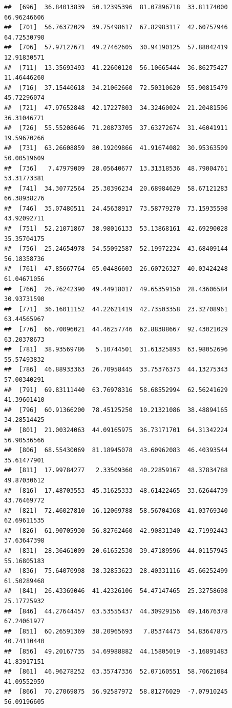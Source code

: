 \documentclass[
]{article}
\begin{document}
\begin{verbatim}
##  [696]  36.84013839  50.12395396  81.07896718  33.81174000  66.96246606
##  [701]  56.76372029  39.75498617  67.82983117  42.60757946  64.72530790
##  [706]  57.97127671  49.27462605  30.94190125  57.88042419  12.91830571
##  [711]  13.35693493  41.22600120  56.10665444  36.86275427  11.46446260
##  [716]  37.15440618  34.21062660  72.50310620  55.90815479  45.72296074
##  [721]  47.97652848  42.17227803  34.32460024  21.20481506  36.31046771
##  [726]  55.55208646  71.20873705  37.63272674  31.46041911  19.59670266
##  [731]  63.26608859  80.19209866  41.91674082  30.95363509  50.00519609
##  [736]   7.47979009  28.05640677  13.31318536  48.79004761  53.31773381
##  [741]  34.30772564  25.30396234  20.68984629  58.67121283  66.38938276
##  [746]  35.07480511  24.45638917  73.58779270  73.15935598  43.92092711
##  [751]  52.21071867  38.98016133  53.13868161  42.69290028  35.35704175
##  [756]  25.24654978  54.55092587  52.19972234  43.68409144  56.18358736
##  [761]  47.85667764  65.04486603  26.60726327  40.03424248  61.04671056
##  [766]  26.76242390  49.44918017  49.65359150  28.43606584  30.93731590
##  [771]  36.16011152  44.22621419  42.73503358  23.32708961  63.44565967
##  [776]  66.70096021  44.46257746  62.88388667  92.43021029  63.20378673
##  [781]  38.93569786   5.10744501  31.61325893  63.98052696  55.57493832
##  [786]  46.88933363  26.70958445  33.75376373  44.13275343  57.00340291
##  [791]  69.83111440  63.76978316  58.68552994  62.56241629  41.39601410
##  [796]  60.91366200  78.45125250  10.21321086  38.48894165  34.28514425
##  [801]  21.00324063  44.09165975  36.73171701  64.31342224  56.90536566
##  [806]  68.55430069  81.18945078  43.60962083  46.40393544  35.61477901
##  [811]  17.99784277   2.33509360  40.22859167  48.37834788  49.87030612
##  [816]  17.48703553  45.31625333  48.61422465  33.62644739  43.76469772
##  [821]  72.46027810  16.12069788  58.56704368  41.03769340  62.69611535
##  [826]  61.90705930  56.82762460  42.90831340  42.71992443  37.63647398
##  [831]  28.36461009  20.61652530  39.47189596  44.01157945  55.16805183
##  [836]  75.64070998  38.32853623  28.40331116  45.66252499  61.50289468
##  [841]  26.43369046  41.42326106  54.47147465  25.32758698  25.17725932
##  [846]  44.27644457  63.53555437  44.30929156  49.14676378  67.24061977
##  [851]  60.26591369  38.20965693   7.85374473  54.83647875  40.74110440
##  [856]  49.20167735  54.69988882  44.15805019  -3.16891483  41.83917151
##  [861]  46.96278252  63.35747336  52.07160551  58.70621084  41.09552959
##  [866]  70.27069875  56.92587972  58.81276029  -7.07910245  56.09196605

\end{verbatim}
\end{document}
